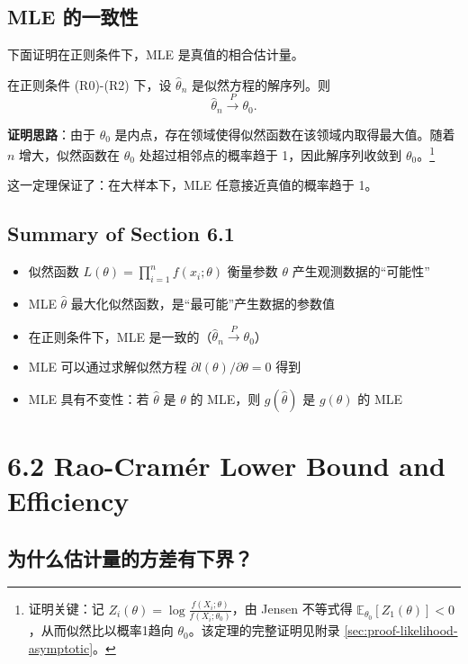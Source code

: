 \subsection{MLE 的一致性}

下面证明在正则条件下，MLE 是真值的相合估计量。

\begin{theorem}\label{th:mle-consistency}
在正则条件 (R0)-(R2) 下，设 $\widehat{\theta}_n$ 是似然方程的解序列。则
\[
\widehat{\theta}_n \xrightarrow{P} \theta_0.
\]
\end{theorem}

\textbf{证明思路}：由于 $\theta_0$ 是内点，存在领域使得似然函数在该领域内取得最大值。随着 $n$ 增大，似然函数在 $\theta_0$ 处超过相邻点的概率趋于 1，因此解序列收敛到 $\theta_0$。\footnote{证明关键：记 $Z_i(\theta) = \log\frac{f(X_i;\theta)}{f(X_i;\theta_0)}$，由 Jensen 不等式得 $\mathbb{E}_{\theta_0}[Z_1(\theta)] < 0$，从而似然比以概率1趋向 $\theta_0$。该定理的完整证明见附录 \cref{sec:proof-likelihood-asymptotic}。}

这一定理保证了：在大样本下，MLE 任意接近真值的概率趋于 1。

\subsection{Summary of Section 6.1}

\begin{itemize}
\item 似然函数 $L(\theta) = \prod_{i=1}^n f(x_i; \theta)$ 衡量参数 $\theta$ 产生观测数据的``可能性''
\item MLE $\widehat{\theta}$ 最大化似然函数，是``最可能''产生数据的参数值
\item 在正则条件下，MLE 是一致的（$\widehat{\theta}_n \xrightarrow{P} \theta_0$）
\item MLE 可以通过求解似然方程 $\partial l(\theta)/\partial \theta = 0$ 得到
\item MLE 具有不变性：若 $\widehat{\theta}$ 是 $\theta$ 的 MLE，则 $g(\widehat{\theta})$ 是 $g(\theta)$ 的 MLE
\end{itemize}

\section{6.2 Rao-Cramér Lower Bound and Efficiency}\label{sec:6.2}

\subsection{为什么估计量的方差有下界？}

